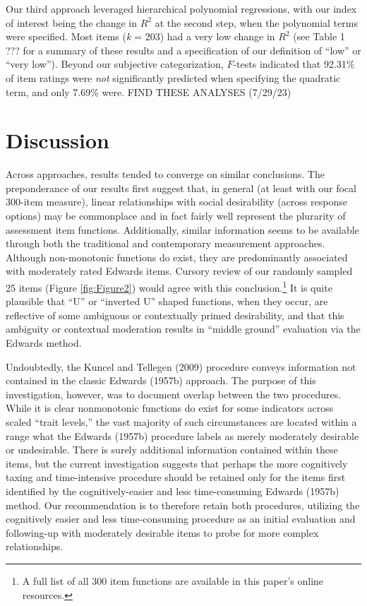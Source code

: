 \documentclass[
  ,jou]{apa6}
\begin{document}
Our third approach leveraged hierarchical polynomial regressions, with our index of interest being the change in \(R^2\) at the second step, when the polynomial terms were specified. Most items (\emph{k} = 203) had a very low change in \(R^2\) (see Table 1 ??? for a summary of these results and a specification of our definition of ``low'' or ``very low''). Beyond our subjective categorization, \(F\)-tests indicated that 92.31\% of item ratings were \emph{not} significantly predicted when specifying the quadratic term, and only 7.69\% were. \rightarrow FIND THESE ANALYSES (7/29/23)

\hypertarget{discussion}{%
\section{Discussion}\label{discussion}}

Across approaches, results tended to converge on similar conclusions. The preponderance of our results first suggest that, in general (at least with our focal 300-item measure), linear relationships with social desirability (across response options) may be commonplace and in fact fairly well represent the plurarity of assessment item functions. Additionally, similar information seems to be available through both the traditional and contemporary measurement approaches. Although non-monotonic functions do exist, they are predominantly associated with moderately rated Edwards items. Cursory review of our randomly sampled 25 items (Figure \ref{fig:Figure2}) would agree with this conclusion.\footnote{A full list of all 300 item functions are available in this paper's online resources.} It is quite plausible that ``U'' or ``inverted U'' shaped functions, when they occur, are reflective of some ambiguous or contextually primed desirability, and that this ambiguity or contextual moderation results in ``middle ground'' evaluation via the Edwards method.

Undoubtedly, the Kuncel and Tellegen (2009) procedure conveys information not contained in the classic Edwards (1957b) approach. The purpose of this investigation, however, was to document overlap between the two procedures. While it is clear nonmonotonic functions do exist for some indicators across scaled ``trait levels,'' the vast majority of such circumstances are located within a range what the Edwards (1957b) procedure labels as merely moderately desirable or undesirable. There is surely additional information contained within these items, but the current investigation suggests that perhaps the more cognitively taxing and time-intensive procedure should be retained only for the items first identified by the cognitively-easier and less time-consuming Edwards (1957b) method. Our recommendation is to therefore retain both procedures, utilizing the cognitively easier and less time-consuming procedure as an initial evaluation and following-up with moderately desirable items to probe for more complex relationships.
\end{document}
